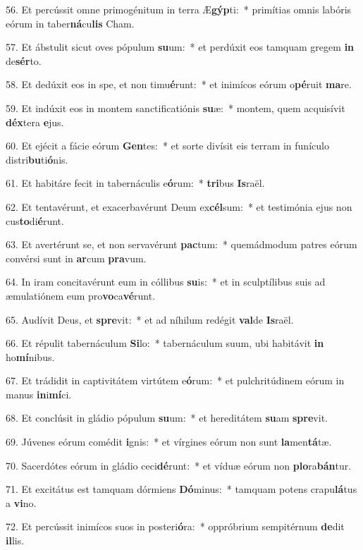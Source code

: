 56. Et percússit omne primogénitum in terra Æ\textbf{gýp}ti:~*  primítias omnis labóris eórum in taber\textbf{ná}cu\textbf{lis} Cham.\

57. Et ábstulit sicut oves pópulum \textbf{su}um:~*  et perdúxit eos tamquam gregem \textbf{in} de\textbf{sér}to.\

58. Et dedúxit eos in spe, et non timu\textbf{é}runt:~*  et inimícos eórum o\textbf{pé}ruit \textbf{ma}re.\

59. Et indúxit eos in montem sanctificatiónis \textbf{su}æ:~*  montem, quem acquisívit \textbf{déx}tera \textbf{e}jus.\

60. Et ejécit a fácie eórum \textbf{Gen}tes:~*  et sorte divísit eis terram in funículo distri\textbf{bu}ti\textbf{ó}nis.\

61. Et habitáre fecit in tabernáculis e\textbf{ó}rum:~*  \textbf{tri}bus \textbf{Is}raël.\

62. Et tentavérunt, et exacerbavérunt Deum ex\textbf{cél}sum:~*  et testimónia ejus non cus\textbf{to}di\textbf{é}runt.\

63. Et avertérunt se, et non servavérunt \textbf{pac}tum:~*  quemádmodum patres eórum convérsi sunt in \textbf{ar}cum \textbf{pra}vum.\

64. In iram concitavérunt eum in cóllibus \textbf{su}is:~*  et in sculptílibus suis ad æmulatiónem eum pro\textbf{vo}ca\textbf{vé}runt.\

65. Audívit Deus, et \textbf{spre}vit:~*  et ad níhilum redégit \textbf{val}de \textbf{Is}raël.\

66. Et répulit tabernáculum \textbf{Si}lo:~*  tabernáculum suum, ubi habitávit \textbf{in} ho\textbf{mí}nibus.\

67. Et trádidit in captivitátem virtútem e\textbf{ó}rum:~*  et pulchritúdinem eórum in manus \textbf{in}i\textbf{mí}ci.\

68. Et conclúsit in gládio pópulum \textbf{su}um:~*  et hereditátem \textbf{su}am \textbf{spre}vit.\

69. Júvenes eórum comédit \textbf{i}gnis:~*  et vírgines eórum non sunt \textbf{la}men\textbf{tá}tæ.\

70. Sacerdótes eórum in gládio ceci\textbf{dé}runt:~*  et víduæ eórum non \textbf{plo}ra\textbf{bán}tur.\

71. Et excitátus est tamquam dórmiens \textbf{Dó}minus:~*  tamquam potens crapu\textbf{lá}tus a \textbf{vi}no.\

72. Et percússit inimícos suos in posteri\textbf{ó}ra:~*  oppróbrium sempitérnum \textbf{de}dit \textbf{il}lis.\

